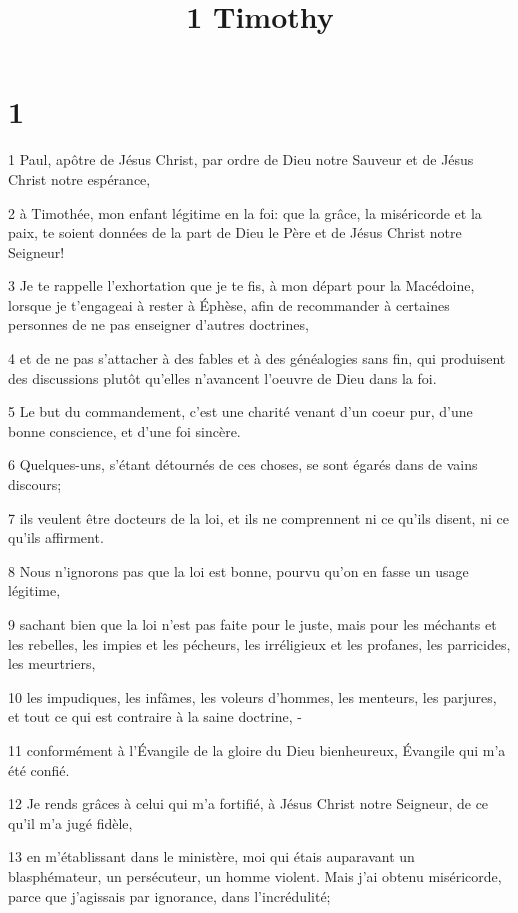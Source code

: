 

\title{1 Timothy}


\chapter{1}

\par 1 Paul, apôtre de Jésus Christ, par ordre de Dieu notre Sauveur et de Jésus Christ notre espérance,
\par 2 à Timothée, mon enfant légitime en la foi: que la grâce, la miséricorde et la paix, te soient données de la part de Dieu le Père et de Jésus Christ notre Seigneur!
\par 3 Je te rappelle l'exhortation que je te fis, à mon départ pour la Macédoine, lorsque je t'engageai à rester à Éphèse, afin de recommander à certaines personnes de ne pas enseigner d'autres doctrines,
\par 4 et de ne pas s'attacher à des fables et à des généalogies sans fin, qui produisent des discussions plutôt qu'elles n'avancent l'oeuvre de Dieu dans la foi.
\par 5 Le but du commandement, c'est une charité venant d'un coeur pur, d'une bonne conscience, et d'une foi sincère.
\par 6 Quelques-uns, s'étant détournés de ces choses, se sont égarés dans de vains discours;
\par 7 ils veulent être docteurs de la loi, et ils ne comprennent ni ce qu'ils disent, ni ce qu'ils affirment.
\par 8 Nous n'ignorons pas que la loi est bonne, pourvu qu'on en fasse un usage légitime,
\par 9 sachant bien que la loi n'est pas faite pour le juste, mais pour les méchants et les rebelles, les impies et les pécheurs, les irréligieux et les profanes, les parricides, les meurtriers,
\par 10 les impudiques, les infâmes, les voleurs d'hommes, les menteurs, les parjures, et tout ce qui est contraire à la saine doctrine, -
\par 11 conformément à l'Évangile de la gloire du Dieu bienheureux, Évangile qui m'a été confié.
\par 12 Je rends grâces à celui qui m'a fortifié, à Jésus Christ notre Seigneur, de ce qu'il m'a jugé fidèle,
\par 13 en m'établissant dans le ministère, moi qui étais auparavant un blasphémateur, un persécuteur, un homme violent. Mais j'ai obtenu miséricorde, parce que j'agissais par ignorance, dans l'incrédulité;
